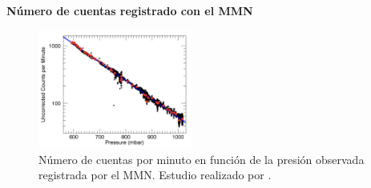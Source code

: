     \begin{frame}{} %
        \justifying %
        \vspace*{-0.1cm} %

        \begin{tcolorbox}[colback=custombgcolor9, coltext=customfgcolor2,
                      colframe=custombgcolor9, %
                      width=\textwidth,       %
                      boxrule=1pt,            %
                      top=1mm, bottom=1mm,     %
                      sharp corners=all,     %
                      halign=center,         %
                      valign=center,         %
                      ]
            \textbf{Número de cuentas registrado con el MMN}        
        \end{tcolorbox}
        
        \begin{figure}
            \centering
            \includegraphics[width=0.45\textwidth]{Figures/rate-MMN.png}
            \caption{\tiny Número de cuentas por minuto en función de la presión observada registrada por el MMN. Estudio realizado por \cite{lara2016}.}
        \end{figure}
    \end{frame}    